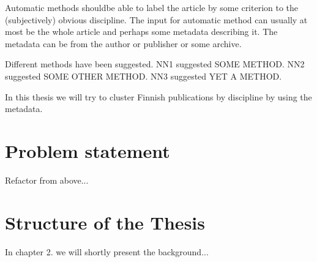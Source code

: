 Automatic methods shouldbe able to label the article by some 
criterion to the (subjectively) obvious discipline. The input for 
automatic method can usually at most be the whole article and 
perhaps some metadata describing it. The metadata can be from the 
author or publisher or some archive.

Different methods have been suggested. NN1 suggested SOME METHOD. 
NN2 suggested SOME OTHER METHOD. NN3 suggested YET A METHOD.

In this thesis we will try to cluster Finnish publications by 
discipline by using the metadata.






\section{Problem statement}

Refactor from above...

\section{Structure of the Thesis}
\label{section:structure} 

In chapter 2. we will shortly present the background...
